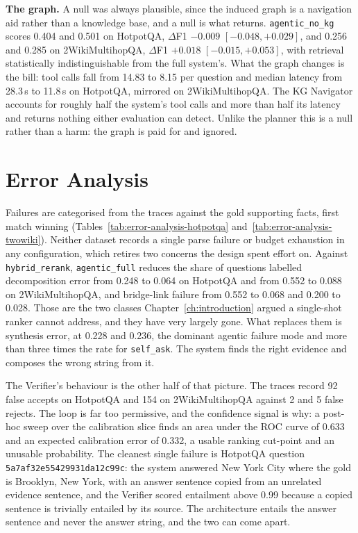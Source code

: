 \textbf{The graph.} A null was always plausible, since the induced graph is a
navigation aid rather than a knowledge base, and a null is what returns.
\texttt{agentic\_no\_kg} scores 0.404 and 0.501 on HotpotQA, $\Delta$F1
$-0.009$ $[-0.048, +0.029]$, and 0.256 and 0.285 on 2WikiMultihopQA,
$\Delta$F1 $+0.018$ $[-0.015, +0.053]$, with retrieval statistically
indistinguishable from the full system's. What the graph changes is the bill:
tool calls fall from 14.83 to 8.15 per question and median latency from
28.3\,s to 11.8\,s on HotpotQA, mirrored on 2WikiMultihopQA. The KG Navigator
accounts for roughly half the system's tool calls and more than half its
latency and returns nothing either evaluation can detect. Unlike the planner
this is a null rather than a harm: the graph is paid for and ignored.

\section{Error Analysis}
\label{sec:errors}



Failures are categorised from the traces against the gold supporting facts,
first match winning (Tables~\ref{tab:error-analysis-hotpotqa}
and~\ref{tab:error-analysis-twowiki}). Neither dataset records a single parse
failure or budget exhaustion in any configuration, which retires two concerns
the design spent effort on. Against \texttt{hybrid\_rerank},
\texttt{agentic\_full} reduces the share of questions labelled decomposition
error from 0.248 to 0.064 on HotpotQA and from 0.552 to 0.088 on
2WikiMultihopQA, and bridge-link failure from 0.552 to 0.068 and 0.200 to
0.028. Those are the two classes Chapter~\ref{ch:introduction} argued a
single-shot ranker cannot address, and they have very largely gone. What
replaces them is synthesis error, at 0.228 and 0.236, the dominant agentic
failure mode and more than three times the rate for \texttt{self\_ask}. The
system finds the right evidence and composes the wrong string from it.

The Verifier's behaviour is the other half of that picture. The traces record
92 false accepts on HotpotQA and 154 on 2WikiMultihopQA against 2 and 5 false
rejects. The loop is far too permissive, and the confidence signal is why: a
post-hoc sweep over the calibration slice finds an area under the ROC curve of
0.633 and an expected calibration error of 0.332, a usable ranking cut-point
and an unusable probability. The cleanest single failure is HotpotQA question
\texttt{5a7af32e55429931da12c99c}: the system answered New York City where the
gold is Brooklyn, New York, with an answer sentence copied from an unrelated
evidence sentence, and the Verifier scored entailment above 0.99 because a
copied sentence is trivially entailed by its source. The architecture entails
the answer sentence and never the answer string, and the two can come apart.

